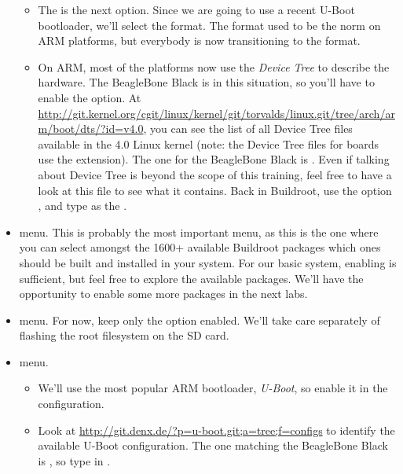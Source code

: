 \begin{itemize}
\begin{itemize}
  \item The  is the next option. Since we
    are going to use a recent U-Boot bootloader, we'll select the
     format. The  format used to be the norm
    on ARM platforms, but everybody is now transitioning to the
     format.

  \item On ARM, most of the platforms now use the {\em Device Tree} to
    describe the hardware. The BeagleBone Black is in this situation,
    so you'll have to enable the 
    option. At
    \url{http://git.kernel.org/cgit/linux/kernel/git/torvalds/linux.git/tree/arch/arm/boot/dts/?id=v4.0},
    you can see the list of all Device Tree files available in the 4.0
    Linux kernel (note: the Device Tree files for boards use the
     extension). The one for the BeagleBone Black is
    . Even if talking about Device Tree is
    beyond the scope of this training, feel free to have a look at
    this file to see what it contains. Back in Buildroot, use the
    option , and type
     as the .

  \end{itemize}

\item {} menu. This is probably the most important
  menu, as this is the one where you can select amongst the 1600+
  available Buildroot packages which ones should be built and
  installed in your system. For our basic system, enabling
   is sufficient, but feel free to explore the available
  packages. We'll have the opportunity to enable some more packages in
  the next labs.

\item {} menu. For now, keep only the  option enabled. We'll take care separately of
  flashing the root filesystem on the SD card.

\item {} menu.

  \begin{itemize}

  \item We'll use the most popular ARM bootloader, {\em U-Boot}, so
    enable it in the configuration.

  \item Look at
    \url{http://git.denx.de/?p=u-boot.git;a=tree;f=configs} to
    identify the available U-Boot configuration. The one matching the
    BeagleBone Black is , so type
     in .


\end{itemize}
\end{itemize}
